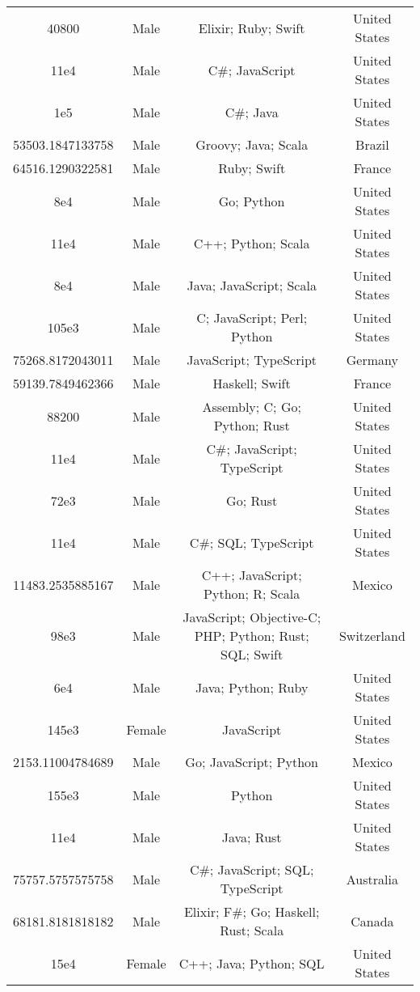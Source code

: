 \begin{center}
\begin{tabular}{ |c|c|c|c| }
40800  &  Male  &  Elixir; Ruby; Swift  &  United States  \\ 
11e4  &  Male  &  C\#; JavaScript  &  United States  \\ 
1e5  &  Male  &  C\#; Java  &  United States  \\ 
53503.1847133758  &  Male  &  Groovy; Java; Scala  &  Brazil  \\ 
64516.1290322581  &  Male  &  Ruby; Swift  &  France  \\ 
8e4  &  Male  &  Go; Python  &  United States  \\ 
11e4  &  Male  &  C++; Python; Scala  &  United States  \\ 
8e4  &  Male  &  Java; JavaScript; Scala  &  United States  \\ 
105e3  &  Male  &  C; JavaScript; Perl; Python  &  United States  \\ 
75268.8172043011  &  Male  &  JavaScript; TypeScript  &  Germany  \\ 
59139.7849462366  &  Male  &  Haskell; Swift  &  France  \\ 
88200  &  Male  &  Assembly; C; Go; Python; Rust  &  United States  \\ 
11e4  &  Male  &  C\#; JavaScript; TypeScript  &  United States  \\ 
72e3  &  Male  &  Go; Rust  &  United States  \\ 
11e4  &  Male  &  C\#; SQL; TypeScript  &  United States  \\ 
11483.2535885167  &  Male  &  C++; JavaScript; Python; R; Scala  &  Mexico  \\ 
98e3  &  Male  &  JavaScript; Objective-C; PHP; Python; Rust; SQL; Swift  &  Switzerland  \\ 
6e4  &  Male  &  Java; Python; Ruby  &  United States  \\ 
145e3  &  Female  &  JavaScript  &  United States  \\ 
2153.11004784689  &  Male  &  Go; JavaScript; Python  &  Mexico  \\ 
155e3  &  Male  &  Python  &  United States  \\ 
11e4  &  Male  &  Java; Rust  &  United States  \\ 
75757.5757575758  &  Male  &  C\#; JavaScript; SQL; TypeScript  &  Australia  \\ 
68181.8181818182  &  Male  &  Elixir; F\#; Go; Haskell; Rust; Scala  &  Canada  \\ 
15e4  &  Female  &  C++; Java; Python; SQL  &  United States  \\ 

\end{tabular}
\end{center}
